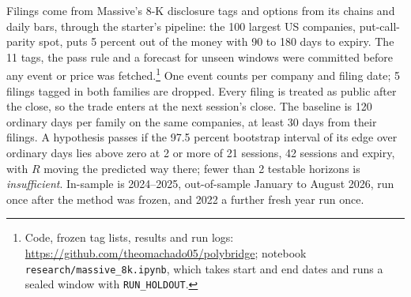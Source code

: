 \documentclass[11pt]{article}
\makeatletter
\renewcommand\section{\@startsection{section}{1}{\z@}{-1.2ex \@plus -.3ex \@minus -.2ex}{0.4ex}{\normalfont\normalsize\bfseries}}
\makeatother
\begin{document}
\section{Data and method}
Filings come from Massive's 8-K disclosure tags and options from its chains and daily bars, through the starter's pipeline: the 100 largest US companies, put-call-parity spot, puts 5 percent out of the money with 90 to 180 days to expiry. The 11 tags, the pass rule and a forecast for unseen windows were committed before any event or price was fetched.\footnote{Code, frozen tag lists, results and run logs: \url{https://github.com/theomachado05/polybridge}; notebook \texttt{research/massive\_8k.ipynb}, which takes start and end dates and runs a sealed window with \texttt{RUN\_HOLDOUT}.} One event counts per company and filing date; 5 filings tagged in both families are dropped. Every filing is treated as public after the close, so the trade enters at the next session's close. The baseline is 120 ordinary days per family on the same companies, at least 30 days from their filings. A hypothesis passes if the 97.5 percent bootstrap interval of its edge over ordinary days lies above zero at 2 or more of 21 sessions, 42 sessions and expiry, with $R$ moving the predicted way there; fewer than 2 testable horizons is \emph{insufficient}. In-sample is 2024--2025, out-of-sample January to August 2026, run once after the method was frozen, and 2022 a further fresh year run once.
\end{document}
